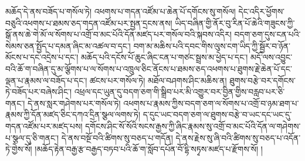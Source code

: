མཆོད་དེ་ནས་བཟོད་པ་གསོལ་ཏེ། འཕགས་པ་གདན་འཛོམ་པ་ཆེན་པོ་དགོངས་སུ་གསོལ། དེང་འདིར་ཕྱོགས་བཅུའི་འཕགས་པ་ཐམས་ཅད་གདན་འཛོམ་པར་སྤྱན་དྲངས་ནས། ཡིད་བཞིན་གྱི་ནོར་བུ་རིན་པོ་ཆེའི་གཟུངས་ཀྱི་སྒོ་ནས་ཆེ་གེ་མོ་ལ་སོགས་པ་འགྲོ་བ་མང་པོའི་དོན་མཛད་པར་གསོལ་བའི་སྐབས་འདིར། བདག་ཅག་དུས་ངན་པའི་སེམས་ཅན་སྤྱོད་པ་དམན་ཞིང་མ་འཚལ་བ་དང་། བག་མ་མཆིས་པའི་དབང་གིས་ལུས་ངག་ཡིད་ཀྱི་སྦྱོར་བ་ཉོན་མོངས་པ་དང་འདྲེས་པ་དང་། མཆོད་པའི་དངོས་པོ་ཆུང་ཞིང་ངན་པ་གཙང་སྦྲས་མ་ཕྱེད་པ་དང་། མདོ་ལས་འབྱུང་བའི་ཆོ་ག་བཞིན་དུ་མ་ལྕོགས་པ་ལ་སོགས་པ་འཁྲུལ་ཅིང་ནོངས་པ་ཐམས་ཅད་འཕགས་པ་ཐུགས་རྗེ་ཆེན་པོ་དང་ལྡན་པ་རྣམས་ལ་བཟོད་པ་དང་། ཚངས་པར་གསོལ་ཏེ། མཐོལ་བཤགས་ཤིང་མཆིས་ན། ཐུགས་བརྩེ་བར་དགོངས་ཏེ་བཟོད་པར་བཞེས་ཤིང་། འཕྲལ་དང་ཡུན་དུ་བདག་ཅག་གི་སྒྲིབ་པར་མི་འགྱུར་བར་བྱིན་གྱིས་བརླབ་པར་ཅི་གནང་། དེ་ནས་སླར་གཤེགས་པར་གསོལ་ཏེ། འཕགས་པ་རྣམས་ཀྱིས་བདག་ཅག་ལ་སོགས་པ་འགྲོ་བ་ཉམ་ཐག་པ་རྣམས་ཀྱི་དོན་མཛད་ཅིང་དཀའ་དྲིན་སྩལ་ལགས་ཏེ། ད་དུང་ཡང་བདག་ཅག་ལ་ཐུགས་བརྩེ་བ་ཡང་དང་ཡང་དུ་གདན་འཛོམ་པར་མཛད་པས། དགོངས་ཤིང་སོ་སོའི་སངས་རྒྱས་ཀྱི་ཞིང་རྣམས་སུ་འགྲོ་བ་མང་པོའི་དོན་ལ་གཤེགས་པ་སྩལ་དུ་ཅི་གནང་། དེ་ནས་བསྔོ་བའི་ཚིགས་སུ་བཅད་པ་གདོན། དེ་ནས་རྗེས་སུ་ཞི་བའི་ཚིགས་སུ་བཅད་པ་འདོན་ཏེ་གྱེས་སོ། །མཆོད་རྟེན་བརྒྱ་རྩ་བརྒྱད་བཏབ་པའི་ཆོ་ག་སློབ་དཔོན་བོ་དྷི་སཏྭས་མཛད་པ་རྫོགས་སོ། །